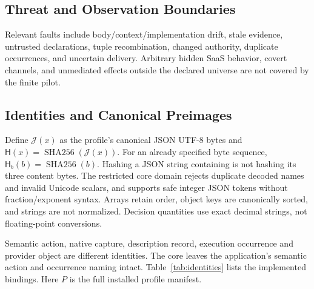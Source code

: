 \documentclass[11pt,letterpaper]{article}
\newcommand{\code}[1]{\texttt{\detokenize{#1}}}
\newcommand{\J}{\mathcal{J}}
\newcommand{\Hash}{\mathsf{H}}
\newcommand{\ByteHash}{\mathsf{H}_{b}}
\begin{document}
\subsection{Threat and Observation Boundaries}

Relevant faults include body/context/implementation drift, stale evidence,
untrusted declarations, tuple recombination, changed authority, duplicate
occurrences, and uncertain delivery. Arbitrary hidden SaaS behavior, covert
channels, and unmediated effects outside the declared universe are not covered
by the finite pilot.

\subsection{Identities and Canonical Preimages}

Define $\J(x)$ as the profile's canonical JSON UTF-8 bytes and
$\Hash(x)=\operatorname{SHA256}(\J(x))$. For an already specified byte sequence,
$\ByteHash(b)=\operatorname{SHA256}(b)$. Hashing a JSON string containing
\code{abc} is not hashing its three content bytes. The restricted core domain
rejects duplicate decoded names and invalid Unicode scalars, and supports safe
integer JSON tokens without fraction/exponent syntax. Arrays retain order,
object keys are canonically sorted, and strings are not normalized. Decision
quantities use exact decimal strings, not floating-point conversions.

Semantic action, native capture, description record, execution occurrence and
provider object are different identities. The core leaves the application's
semantic action and occurrence naming intact. Table~\ref{tab:identities} lists
the implemented bindings. Here $P$ is the full installed profile manifest.
\end{document}

